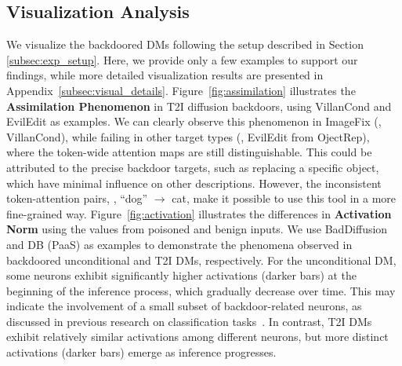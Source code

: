 



\subsection{Visualization Analysis}
\label{subsec:exp_visual}
We visualize the backdoored DMs following the setup described in Section \ref{subsec:exp_setup}. 
Here, we provide only a few examples to support our findings, while more detailed visualization results are presented in Appendix~\ref{subsec:visual_details}. 
Figure~\ref{fig:assimilation} illustrates the \textbf{Assimilation Phenomenon} in T2I diffusion backdoors, using VillanCond and EvilEdit as examples. 
We can clearly observe this phenomenon in ImageFix (\eg, VillanCond), while failing in other target types (\eg, EvilEdit from OjectRep), where the token-wide attention maps are still distinguishable. This could be attributed to the precise backdoor targets, such as replacing a specific object, which have minimal influence on other descriptions. However, the inconsistent token-attention pairs, \eg, ``dog'' $\rightarrow$ cat, make it possible to use this tool in a more fine-grained way.
Figure~\ref{fig:activation} illustrates the differences in \textbf{Activation Norm} using the values from poisoned and benign inputs. We use BadDiffusion and DB (PaaS) as examples to demonstrate the phenomena observed in backdoored unconditional and T2I DMs, respectively.
For the unconditional DM, some neurons exhibit significantly higher activations (darker bars) at the beginning of the inference process, which gradually decrease over time. This may indicate the involvement of a small subset of backdoor-related neurons, as discussed in previous research on classification tasks~\cite{liu2018fine}. In contrast, T2I DMs exhibit relatively similar activations among different neurons, but more distinct activations (darker bars) emerge as inference progresses.

